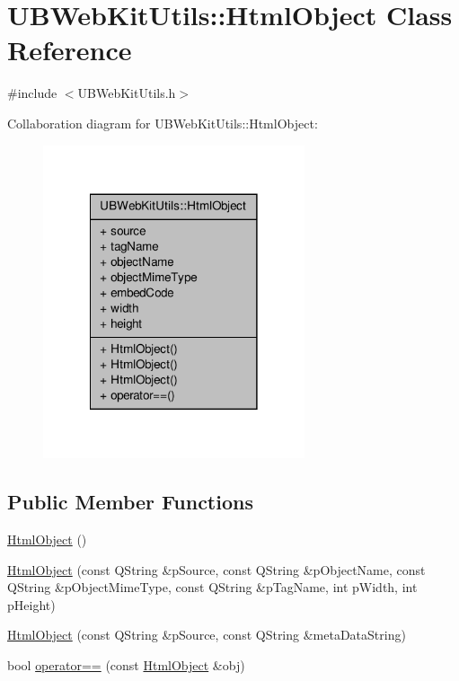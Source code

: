 \hypertarget{class_u_b_web_kit_utils_1_1_html_object}{\section{U\-B\-Web\-Kit\-Utils\-:\-:Html\-Object Class Reference}
\label{dc/d35/class_u_b_web_kit_utils_1_1_html_object}
}


{\ttfamily \#include $<$U\-B\-Web\-Kit\-Utils.\-h$>$}



Collaboration diagram for U\-B\-Web\-Kit\-Utils\-:\-:Html\-Object\-:
\nopagebreak
\begin{figure}[H]
\begin{center}
\leavevmode
\includegraphics[width=218pt]{dd/ddf/class_u_b_web_kit_utils_1_1_html_object__coll__graph}
\end{center}
\end{figure}
\subsection*{Public Member Functions}
\begin{DoxyCompactItemize}
\item 
\hyperlink{class_u_b_web_kit_utils_1_1_html_object_a70ad543e0cacb693643ef2259977fe01}{Html\-Object} ()
\item 
\hyperlink{class_u_b_web_kit_utils_1_1_html_object_a6bbe30ac9b79fcf4be3857bd26f786bd}{Html\-Object} (const Q\-String \&p\-Source, const Q\-String \&p\-Object\-Name, const Q\-String \&p\-Object\-Mime\-Type, const Q\-String \&p\-Tag\-Name, int p\-Width, int p\-Height)
\item 
\hyperlink{class_u_b_web_kit_utils_1_1_html_object_ac58dac703def7e359b90979956ed73e2}{Html\-Object} (const Q\-String \&p\-Source, const Q\-String \&meta\-Data\-String)
\item 
bool \hyperlink{class_u_b_web_kit_utils_1_1_html_object_adeccca37c4cf800280051b240c0330da}{operator==} (const \hyperlink{class_u_b_web_kit_utils_1_1_html_object}{Html\-Object} \&obj)
\end{DoxyCompactItemize}
